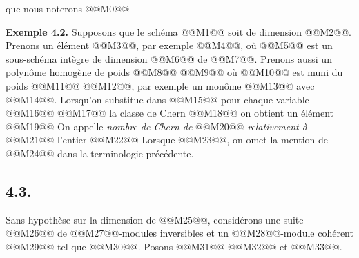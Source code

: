 
que nous noterons
@@M0@@

\textbf{Exemple 4.2.} Supposons que le schéma @@M1@@ soit de dimension @@M2@@. Prenons un élément @@M3@@, par exemple @@M4@@, où @@M5@@ est un sous-schéma intègre de dimension @@M6@@ de @@M7@@. Prenons aussi un polynôme homogène de poids @@M8@@
@@M9@@
où @@M10@@ est muni du poids @@M11@@ @@M12@@, par exemple un monôme @@M13@@ avec @@M14@@. Lorsqu'on substitue dans @@M15@@ pour chaque variable @@M16@@ @@M17@@ la classe de Chern
@@M18@@
on obtient un élément
@@M19@@
On appelle \emph{nombre de Chern de} @@M20@@ \emph{relativement à} @@M21@@ l'entier
@@M22@@
Lorsque @@M23@@, on omet la mention de @@M24@@ dans la terminologie précédente.

\subsection*{4.3.}
Sans hypothèse sur la dimension de @@M25@@, considérons une suite @@M26@@ de @@M27@@-modules inversibles et un @@M28@@-module cohérent @@M29@@ tel que @@M30@@. Posons @@M31@@ @@M32@@ et @@M33@@.

